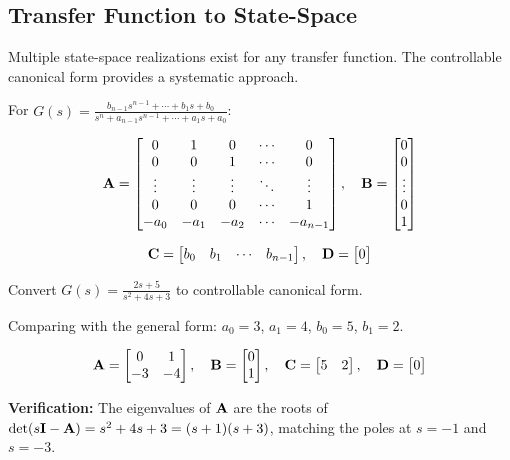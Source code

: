 \subsection{Transfer Function to State-Space}

Multiple state-space realizations exist for any transfer function. The controllable canonical form provides a systematic approach.

For $G(s) = \frac{b_{n-1}s^{n-1} + \cdots + b_1 s + b_0}{s^n + a_{n-1}s^{n-1} + \cdots + a_1 s + a_0}$:

\begin{equation}
\mathbf{A} = \begin{bmatrix}
0 & 1 & 0 & \cdots & 0 \\
0 & 0 & 1 & \cdots & 0 \\
\vdots & \vdots & \vdots & \ddots & \vdots \\
0 & 0 & 0 & \cdots & 1 \\
-a_0 & -a_1 & -a_2 & \cdots & -a_{n-1}
\end{bmatrix}, \quad
\mathbf{B} = \begin{bmatrix} 0 \\ 0 \\ \vdots \\ 0 \\ 1 \end{bmatrix}
\label{eq:ccf_general}
\end{equation}

\begin{equation}
\mathbf{C} = \begin{bmatrix} b_0 & b_1 & \cdots & b_{n-1} \end{bmatrix}, \quad \mathbf{D} = \begin{bmatrix} 0 \end{bmatrix}
\end{equation}

\begin{examplebox}[title=Example 4.6: Transfer Function to State-Space]
Convert $G(s) = \frac{2s + 5}{s^2 + 4s + 3}$ to controllable canonical form.

Comparing with the general form: $a_0 = 3$, $a_1 = 4$, $b_0 = 5$, $b_1 = 2$.

\begin{equation}
\mathbf{A} = \begin{bmatrix} 0 & 1 \\ -3 & -4 \end{bmatrix}, \quad
\mathbf{B} = \begin{bmatrix} 0 \\ 1 \end{bmatrix}, \quad
\mathbf{C} = \begin{bmatrix} 5 & 2 \end{bmatrix}, \quad
\mathbf{D} = \begin{bmatrix} 0 \end{bmatrix}
\end{equation}

\textbf{Verification:} The eigenvalues of $\mathbf{A}$ are the roots of $\det(s\mathbf{I} - \mathbf{A}) = s^2 + 4s + 3 = (s+1)(s+3)$, matching the poles at $s = -1$ and $s = -3$.
\end{examplebox}

